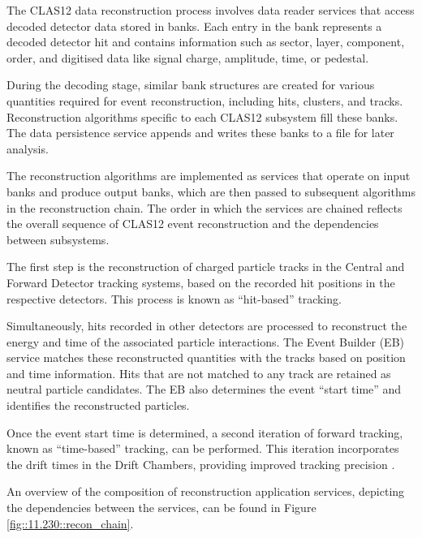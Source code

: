    The CLAS12 data reconstruction process involves data reader services that access decoded detector data stored in banks.
    Each entry in the bank represents a decoded detector hit and contains information such as sector, layer, component, order, and digitised data like signal charge, amplitude, time, or pedestal.

    During the decoding stage, similar bank structures are created for various quantities required for event reconstruction, including hits, clusters, and tracks.
    Reconstruction algorithms specific to each CLAS12 subsystem fill these banks.
    The data persistence service appends and writes these banks to a file for later analysis.

    The reconstruction algorithms are implemented as services that operate on input banks and produce output banks, which are then passed to subsequent algorithms in the reconstruction chain.
    The order in which the services are chained reflects the overall sequence of CLAS12 event reconstruction and the dependencies between subsystems.

    The first step is the reconstruction of charged particle tracks in the Central and Forward Detector tracking systems, based on the recorded hit positions in the respective detectors.
    This process is known as ``hit-based'' tracking.

    Simultaneously, hits recorded in other detectors are processed to reconstruct the energy and time of the associated particle interactions.
    The Event Builder (EB) service matches these reconstructed quantities with the tracks based on position and time information.
    Hits that are not matched to any track are retained as neutral particle candidates.
    The EB also determines the event ``start time'' and identifies the reconstructed particles.

    Once the event start time is determined, a second iteration of forward tracking, known as ``time-based'' tracking, can be performed.
    This iteration incorporates the drift times in the Drift Chambers, providing improved tracking precision \cite{ziegler2020}.

    An overview of the composition of reconstruction application services, depicting the dependencies between the services, can be found in Figure \ref{fig::11.230::recon_chain}.

    
    
